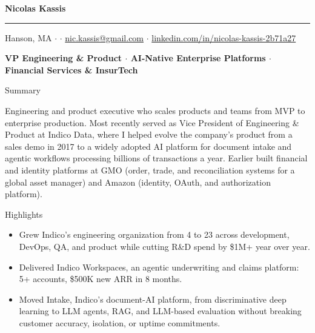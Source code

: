 \documentclass[10pt,oneside]{article}
\makeatletter
\newcommand{\name}{Nicolas Kassis}
\newcommand{\location}{Hanson, MA}
\newcommand{\email}{nic.kassis@gmail.com}
\newcommand{\linkedinurl}{linkedin.com/in/nicolas-kassis-2b71a27}
\providecommand*{\phone}{}
\newcommand{\phoneblock}{\ifx\phone\empty\else\phone{} \; $\cdot$ \; \fi}
\newcommand{\bigname}[1]{
  \begin{center}\fontfamily{phv}\selectfont\Huge\bfseries#1\end{center}
}
\newcommand{\headline}[1]{
  \begin{center}\fontfamily{phv}\selectfont\small\bfseries#1\end{center}
}
\newenvironment{ressection}[1]{
  \vspace{4pt}
  {\fontfamily{phv}\selectfont\Large#1}
  \begin{itemize}
    \vspace{3pt}
}{
  \end{itemize}
}
\newcommand{\ressubitem}[1]{
  \vspace{-1pt}
\item \begin{flushleft} #1 \end{flushleft}
}
\makeatother
\begin{document}
\bigname{\name}
\vspace{-8pt} \rule{\textwidth}{1pt}
\vspace{2pt}
\begin{center}
  {\small \location{} \; $\cdot$ \; \phoneblock\href{mailto:\email}{\email} \; $\cdot$ \; \href{https://\linkedinurl}{\linkedinurl}}
\end{center}
\headline{VP Engineering \& Product $\cdot$ AI-Native Enterprise Platforms $\cdot$ Financial Services \& InsurTech}
\vspace{6pt}

\vspace{4pt}
{\selectfont\Large Summary}
\vspace{3pt}

\begin{flushleft}
Engineering and product executive who scales products and teams from MVP to enterprise production. Most recently served as Vice President of Engineering \& Product at Indico Data, where I helped evolve the company's product from a sales demo in 2017 to a widely adopted AI platform for document intake and agentic workflows processing billions of transactions a year. Earlier built financial and identity platforms at GMO (order, trade, and reconciliation systems for a global asset manager) and Amazon (identity, OAuth, and authorization platform).
\end{flushleft}

\begin{ressection}{Highlights}
  \ressubitem{Grew Indico's engineering organization from 4 to 23 across development, DevOps, QA, and product while cutting R\&D spend by \$1M+ year over year.}
  \ressubitem{Delivered Indico Workspaces, an agentic underwriting and claims platform: 5+ accounts, \$500K new ARR in 8 months.}
  \ressubitem{Moved Intake, Indico's document-AI platform, from discriminative deep learning to LLM agents, RAG, and LLM-based evaluation without breaking customer accuracy, isolation, or uptime commitments.}
\end{ressection}
\end{document}
